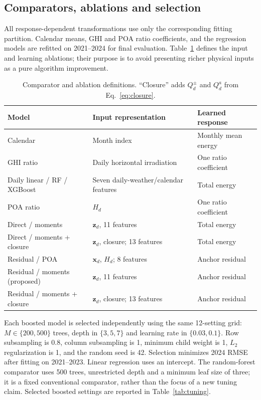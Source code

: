\documentclass[11pt,a4paper]{article}
\begin{document}
\subsection{Comparators, ablations and selection}
All response-dependent transformations use only the corresponding fitting partition. Calendar means, GHI and POA ratio coefficients, and the regression models are refitted on 2021--2024 for final evaluation. Table~\ref{tab:models} defines the input and learning ablations; their purpose is to avoid presenting richer physical inputs as a pure algorithm improvement.
\begin{table}[htbp]\centering\small
\caption{Comparator and ablation definitions. ``Closure'' adds $Q_d^{\pm}$ and $Q_d^{a}$ from Eq.~\eqref{eq:closure}.}\label{tab:models}
\begin{tabularx}{\linewidth}{@{}lXl@{}}\toprule
Model & Input representation & Learned response\\\midrule
Calendar & Month index & Monthly mean energy\\
GHI ratio & Daily horizontal irradiation & One ratio coefficient\\
Daily linear / RF / XGBoost & Seven daily-weather/calendar features & Total energy\\
POA ratio & $H_d$ & One ratio coefficient\\
Direct / moments & $\bm z_d$, 11 features & Total energy\\
Direct / moments + closure & $\bm z_d$, closure; 13 features & Total energy\\
Residual / POA & $\bm x_d$, $H_d$; 8 features & Anchor residual\\
Residual / moments (proposed) & $\bm z_d$, 11 features & Anchor residual\\
Residual / moments + closure & $\bm z_d$, closure; 13 features & Anchor residual\\\bottomrule
\end{tabularx}\end{table}

Each boosted model is selected independently using the same 12-setting grid: $M\in\{200,500\}$ trees, depth in $\{3,5,7\}$ and learning rate in $\{0.03,0.1\}$. Row subsampling is 0.8, column subsampling is 1, minimum child weight is 1, $L_2$ regularization is 1, and the random seed is 42. Selection minimizes 2024 RMSE after fitting on 2021--2023. Linear regression uses an intercept. The random-forest comparator uses 500 trees, unrestricted depth and a minimum leaf size of three; it is a fixed conventional comparator, rather than the focus of a new tuning claim. Selected boosted settings are reported in Table~\ref{tab:tuning}.
\end{document}
